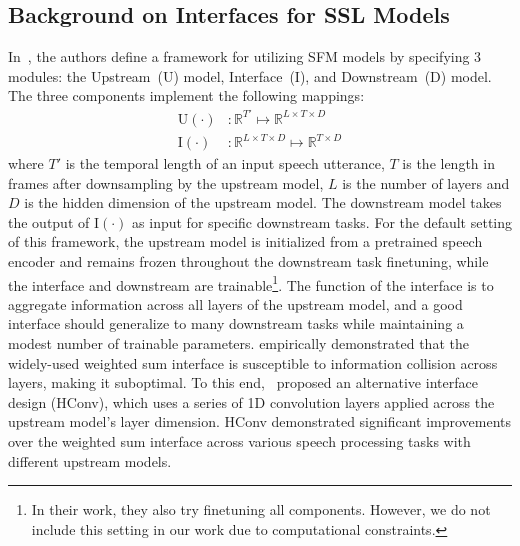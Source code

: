 \subsection{Background on Interfaces for SSL Models}
In~\cite{shih24_interface}, the authors define a framework for utilizing SFM models by specifying 3 modules: the Upstream~($\mathrm{U}$) model, Interface~($\mathrm{I}$), and Downstream~($\mathrm{D}$) model.
The three components implement the following mappings:
\begin{align}
    \mathrm{U}\left(\cdot \right) & : \mathbb{R}^{T'} \mapsto \mathbb{R}^{L\times T\times D} \\
    \mathrm{I}\left(\cdot \right) & : \mathbb{R}^{L\times T\times D} \mapsto \mathbb{R}^{ T\times D} %
\end{align} where $T'$ is the temporal length of an input speech utterance, $T$ is the length in frames after downsampling by the upstream model, $L$ is the number of layers and $D$ is the hidden dimension of the upstream model.
The downstream model takes the output of $\mathrm{I}\left(\cdot \right)$ as input for specific downstream tasks.
For the default setting of this framework, the upstream model is initialized from a pretrained speech encoder and remains frozen throughout the downstream task finetuning, while the interface and downstream are trainable\footnote{In their work, they also try finetuning all components. However, we do not include this setting in our work due to computational constraints.}.
The function of the interface is to aggregate information across all layers of the upstream model, and a good interface should generalize to many downstream tasks while maintaining a modest number of trainable parameters.
\cite{shih24_interface} empirically demonstrated that the widely-used weighted sum interface is susceptible to information collision across layers, making it suboptimal.
To this end,~\cite{shih24_interface} proposed an alternative interface design (HConv), which uses a series of 1D convolution layers applied across the upstream model's layer dimension. HConv demonstrated significant improvements over the weighted sum interface across various speech processing tasks with different upstream models.

